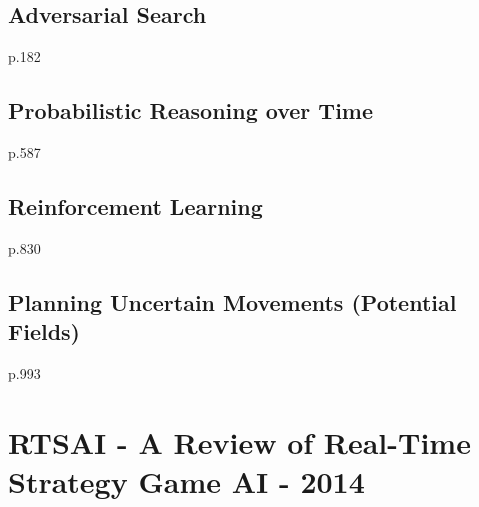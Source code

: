 \subsection{Adversarial Search}
p.182

\subsection{Probabilistic Reasoning over Time}
p.587

\subsection{Reinforcement Learning}
p.830

\subsection{Planning Uncertain Movements (Potential Fields)}
p.993

\section{RTSAI - A Review of Real-Time Strategy Game AI - 2014}
